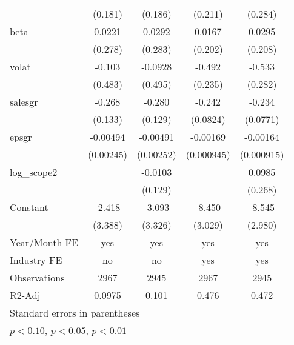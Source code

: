 \begin{table}[htbp]
\begin{tabular}{l*{4}{c}}
                    &     (0.181)         &     (0.186)         &     (0.211)         &     (0.284)         \\
[1em]
beta                &      0.0221         &      0.0292         &      0.0167         &      0.0295         \\
                    &     (0.278)         &     (0.283)         &     (0.202)         &     (0.208)         \\
[1em]
volat               &      -0.103         &     -0.0928         &      -0.492\sym{**} &      -0.533\sym{*}  \\
                    &     (0.483)         &     (0.495)         &     (0.235)         &     (0.282)         \\
[1em]
salesgr             &      -0.268\sym{**} &      -0.280\sym{**} &      -0.242\sym{***}&      -0.234\sym{***}\\
                    &     (0.133)         &     (0.129)         &    (0.0824)         &    (0.0771)         \\
[1em]
epsgr               &    -0.00494\sym{**} &    -0.00491\sym{*}  &    -0.00169\sym{*}  &    -0.00164\sym{*}  \\
                    &   (0.00245)         &   (0.00252)         &  (0.000945)         &  (0.000915)         \\
[1em]
log\_scope2          &                     &     -0.0103         &                     &      0.0985         \\
                    &                     &     (0.129)         &                     &     (0.268)         \\
[1em]
Constant            &      -2.418         &      -3.093         &      -8.450\sym{***}&      -8.545\sym{***}\\
                    &     (3.388)         &     (3.326)         &     (3.029)         &     (2.980)         \\
\hline
Year/Month FE       &         yes         &         yes         &         yes         &         yes         \\
Industry FE         &          no         &          no         &         yes         &         yes         \\
Observations        &        2967         &        2945         &        2967         &        2945         \\
R2-Adj              &      0.0975         &       0.101         &       0.476         &       0.472         \\
\hline\hline
\multicolumn{5}{l}{\footnotesize Standard errors in parentheses}\\
\multicolumn{5}{l}{\footnotesize \sym{*} \(p<0.10\), \sym{**} \(p<0.05\), \sym{***} \(p<0.01\)}\\
\end{tabular}
\end{table}
